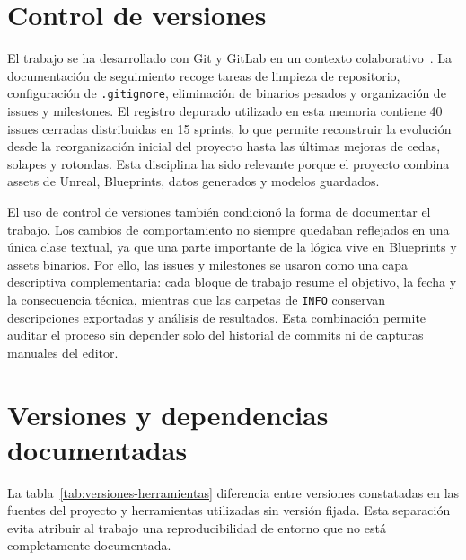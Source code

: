 \section{Control de versiones}

El trabajo se ha desarrollado con Git y GitLab en un contexto colaborativo~\cite{git,gitlabdocs}. La documentación de seguimiento recoge tareas de limpieza de repositorio, configuración de \texttt{.gitignore}, eliminación de binarios pesados y organización de issues y milestones. El registro depurado utilizado en esta memoria contiene 40 issues cerradas distribuidas en 15 sprints, lo que permite reconstruir la evolución desde la reorganización inicial del proyecto hasta las últimas mejoras de cedas, solapes y rotondas. Esta disciplina ha sido relevante porque el proyecto combina assets de Unreal, Blueprints, datos generados y modelos guardados.

El uso de control de versiones también condicionó la forma de documentar el trabajo. Los cambios de comportamiento no siempre quedaban reflejados en una única clase textual, ya que una parte importante de la lógica vive en Blueprints y assets binarios. Por ello, las issues y milestones se usaron como una capa descriptiva complementaria: cada bloque de trabajo resume el objetivo, la fecha y la consecuencia técnica, mientras que las carpetas de \texttt{INFO} conservan descripciones exportadas y análisis de resultados. Esta combinación permite auditar el proceso sin depender solo del historial de commits ni de capturas manuales del editor.

\section{Versiones y dependencias documentadas}

La tabla~\ref{tab:versiones-herramientas} diferencia entre versiones constatadas en las fuentes del proyecto y herramientas utilizadas sin versión fijada. Esta separación evita atribuir al trabajo una reproducibilidad de entorno que no está completamente documentada.

